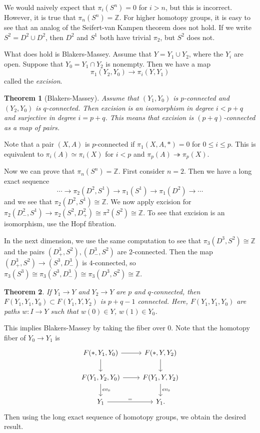 \documentclass[leqno, openany]{memoir}
\newtheorem{thm}{Theorem}[section]
\theoremstyle{definition}
\theoremstyle{remark}
\theoremstyle{plain}
\theoremstyle{definition}
\theoremstyle{remark}
\newcommand{\Z}{\mathbb{Z}}
\begin{document}
We would naively expect that $\pi_i(S^n) = 0$ for $i > n$, but this is incorrect. However, it is true that $\pi_n(S^n) = \Z$. For higher homotopy groups, it is easy to see that an analog of the Seifert-van Kampen theorem does not hold. If we write $S^2 = D^2 \cup D^2$, then $D^2$ and $S^1$ both have trivial $\pi_2$, but $S^2$ does not.

What does hold is Blakers-Massey. Assume that $Y = Y_1 \cup Y_2$, where the $Y_i$ are open. Suppose that $Y_0 = Y_1 \cap Y_2$ is nonempty. Then we have a map
    \[ \pi_1(Y_2, Y_0) \to \pi_i(Y, Y_1) \]
    called the \textit{excision}. 

\begin{thm}[Blakers-Massey]
    Assume that $(Y_1, Y_0)$ is $p$-connected and $(Y_2, Y_0)$ is $q$-connected. Then excision is an isomorphism in degree $i < p+q$ and surjective in degree $i = p+q$. This means that excision is $(p+q)$-connected as a map of pairs.
\end{thm}

Note that a pair $(X,A)$ is $p$-connected if $\pi_1(X,A,*) = 0$ for $0 \leq i \leq p$. This is equivalent to $\pi_i(A) \simeq \pi_i(X)$ for $i < p$ and $\pi_p(A) \twoheadrightarrow \pi_p(X)$.

Now we can prove that $\pi_n(S^n) = \Z$. First consider $n = 2$. Then we have a long exact sequence
\[ \cdots \to \pi_2(D^2, S^1) \to \pi_1(S^1) \to \pi_1(D^2) \to \cdots \]
and we see that $\pi_2(D^2, S^1) \cong \Z$. We now apply excision for $\pi_2(D^2_-, S^1) \to \pi_2(S^2, D^2_+) \cong \pi^2(S^2) \cong \Z$. To see that excision is an isomorphism, use the Hopf fibration.

In the next dimension, we use the same computation to see that $\pi_3(D^3, S^2) \cong \Z$ and the pairs $(D^3_+, S^2), (D^3_-, S^2)$ are $2$-connected. Then the map $(D^3_+, S^2) \to (S^3, D^3_-)$ is $4$-connected, so $\pi_3(S^3) \cong \pi_3(S^3, D^3_-) \cong \pi_3(D^3, S^2) \cong \Z$.

\begin{thm}
    If $Y_1 \to Y$ and $Y_2 \to Y$ are $p$ and $q$-connected, then $F(Y_1, Y_1, Y_0) \subset F(Y_1, Y, Y_2)$ is $p + q - 1$ connected. Here, $F(Y_1, Y_1, Y_0)$ are paths $w \colon I \to Y$ such that $w(0) \in Y$, $w(1) \in Y_0$.
\end{thm}

This implies Blakers-Massey by taking the fiber over $0$. Note that the homotopy fiber of $Y_0 \to Y_1$ is 
\begin{equation*}
\begin{tikzcd}
    F(*, Y_1, Y_0) \arrow{d} \arrow{r} & F(*, Y, Y_2) \arrow{d} \\
    F(Y_1, Y_2, Y_0) \arrow{r} \arrow{d}{ev_0} & F(Y_1, Y, Y_2) \arrow{d}{ev_0} \\
    Y_1 \arrow{r}{=} & Y_1.
\end{tikzcd}
\end{equation*}
Then using the long exact sequence of homotopy groups, we obtain the desired result.
\end{document}
